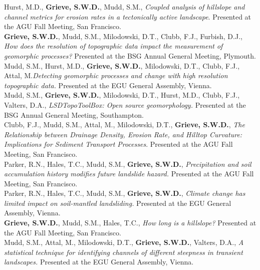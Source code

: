 \documentclass[10pt, a4paper]{article}
\newcommand{\years}[1]{\marginnote{\scriptsize #1}}
\begin{document}
\years{2016}Hurst, M.D., \textbf{Grieve, S.W.D.}, Mudd, S.M., \textit{Coupled analysis of hillslope and channel metrics for erosion rates in a tectonically active landscape}. Presented at the AGU Fall Meeting, San Francisco.\\[0.5cm]

\years{2016}\textbf{Grieve, S.W.D.}, Mudd, S.M., Milodowski, D.T., Clubb, F.J., Furbish, D.J., \textit{How does the resolution of topographic data impact the measurement of geomorphic processes?} Presented at the BSG Annual General Meeting, Plymouth.\\[0.05cm]

\years{2016}Mudd, S.M., Hurst, M.D., \textbf{Grieve, S.W.D.}, Milodowski, D.T., Clubb, F.J., Attal, M.\textit{Detecting geomorphic processes and change with high resolution topographic data.} Presented at the EGU General Assembly, Vienna.\\[0.05cm]

\years{2015}Mudd, S.M., \textbf{Grieve, S.W.D.}, Milodowski, D.T., Hurst, M.D., Clubb, F.J., Valters, D.A., \textit{LSDTopoToolBox: Open source geomorphology.} Presented at the BSG Annual General Meeting, Southampton.\\[0.05cm]

\years{2015}Clubb, F.J., Mudd, S.M., Attal, M., Milodowski, D.T., \textbf{Grieve, S.W.D.}, \textit{The Relationship between Drainage Density, Erosion Rate, and Hilltop Curvature: Implications for Sediment Transport Processes}. Presented at the AGU Fall Meeting, San Francisco.\\[0.5cm]

\years{2015}Parker, R.N., Hales, T.C., Mudd, S.M., \textbf{Grieve, S.W.D.}, \textit{Precipitation and soil accumulation history modifies future landslide hazard.} Presented at the AGU Fall Meeting, San Francisco.\\[0.05cm]

\years{2015}Parker, R.N., Hales, T.C., Mudd, S.M., \textbf{Grieve, S.W.D.}, \textit{Climate change has limited impact on soil-mantled landsliding.} Presented at the EGU General Assembly, Vienna.\\[0.05cm]

\years{2014}\textbf{Grieve, S.W.D.}, Mudd, S.M., Hales, T.C., \textit{How long is a hillslope?} Presented at the AGU Fall Meeting, San Francisco.\\[0.05cm]

\years{2014}Mudd, S.M., Attal, M., Milodowski, D.T., \textbf{Grieve, S.W.D.}, Valters, D.A., \textit{A statistical technique for identifying channels of different steepness in transient landscapes.} Presented at the EGU General Assembly, Vienna.\\[0.05cm]
\end{document}
